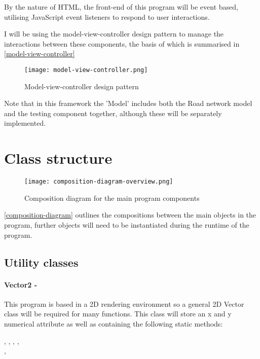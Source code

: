     By the nature of HTML, the front-end of this program will be event based, utilising JavaScript event listeners to respond to user interactions.

    I will be using the model-view-controller design pattern to manage the interactions between these components, the basis of which is summarised in \autoref{model-view-controller}

    \begin{figure}
        \centering
        \texttt{[image: model-view-controller.png]}
        \caption{Model-view-controller design pattern}
        \label{model-view-controller}
    \end{figure}

    Note that in this framework the 'Model' includes both the Road network model and the testing component together, although these will be separately implemented.

\section{Class structure}

    \begin{figure}
        \centering
        \texttt{[image: composition-diagram-overview.png]}
        \caption{Composition diagram for the main program components}
        \label{composition-diagram}
    \end{figure}

    \autoref{composition-diagram} outlines the compositions between the main objects in the program, further objects will need to be instantiated during the runtime of the program.

    \subsection{Utility classes}

    \paragraph{Vector2 -}

        This program is based in a 2D rendering environment so a general 2D Vector class will be required for many functions. This class will store an x and y numerical attribute as well as containing the following static methods:

        ,
        ,
        ,
        ,\\
        ,

